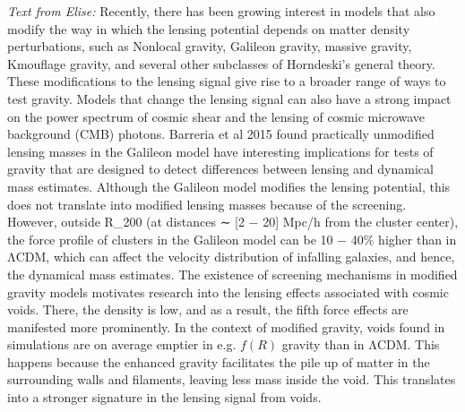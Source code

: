 {\it Text from Elise:} 
Recently, there has been growing interest in models that also modify the way in which the lensing potential depends on matter density perturbations, such as Nonlocal gravity, Galileon gravity, massive gravity, Kmouflage gravity, and several other subclasses of Horndeski’s general theory.
These modifications to the lensing signal give rise to a broader range of ways to test gravity.
Models that change the lensing signal can also have a strong impact on the power spectrum of cosmic shear and the lensing of cosmic microwave background (CMB) photons.
Barreria et al 2015 found practically unmodified lensing masses in the Galileon model have interesting implications for tests of gravity that are designed to detect differences between lensing and dynamical mass estimates. Although the Galileon model modifies the lensing potential, this does not translate into modified lensing masses because of the screening. However, outside R_{200} (at distances ∼ [2 − 20] Mpc/h from the cluster center), the force profile of clusters in the Galileon model can be 10 − 40\% higher than in ΛCDM, which can affect the velocity distribution of infalling galaxies, and hence, the dynamical mass estimates. 
The existence of screening mechanisms in modified gravity models motivates research into the lensing effects associated with cosmic voids. There, the density is low, and as a result, the fifth force effects are manifested more prominently. In the context of modified gravity, voids found in simulations are on average emptier in e.g. $f(R)$ gravity than in ΛCDM. This happens because the enhanced gravity facilitates the pile up of matter in the surrounding walls and filaments, leaving less mass inside the void. This translates into a stronger signature in the lensing signal from voids.

